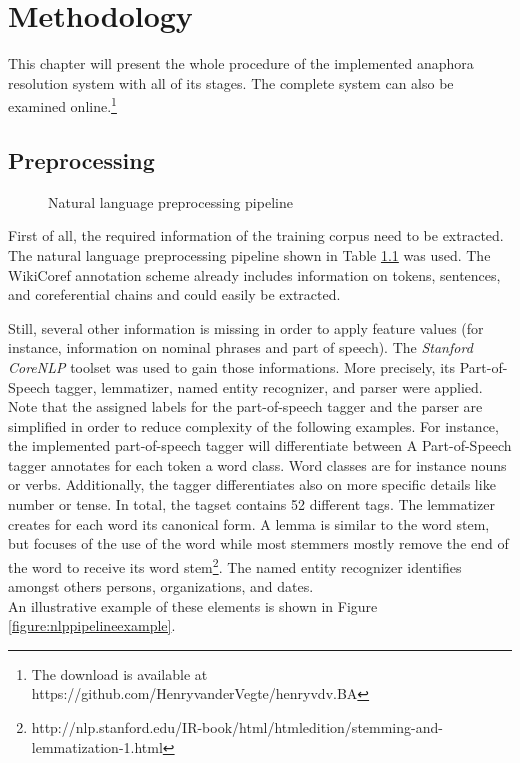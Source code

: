 \chapter{Methodology}
\label{sec:Methodology}

This chapter will present the whole procedure of the implemented anaphora resolution system with all of its stages. The complete system can also be examined online.\footnote{The download is available at https://github.com/HenryvanderVegte/henryvdv.BA}


\section{Preprocessing}
\begin{figure}[h]
	\centering

	\caption{Natural language preprocessing pipeline}
	\label{figure:nlppipeline}
\end{figure}

First of all, the required information of the training corpus need to be extracted. The natural language preprocessing pipeline shown in Table \ref{figure:nlppipeline} was used.  The WikiCoref annotation scheme already includes information on tokens, sentences, and coreferential chains and could easily be extracted.

Still, several other information is missing in order to apply feature values (for instance, information on nominal phrases and part of speech). The \textit{Stanford CoreNLP} toolset \citep{manning-EtAl:2014:P14-5} was used to gain those informations. More precisely, its Part-of-Speech tagger, lemmatizer, named entity recognizer, and parser were applied. 
Note that the assigned labels for the part-of-speech tagger and the parser are simplified in order to reduce complexity of the following examples. For instance, the implemented part-of-speech tagger will differentiate between 
A Part-of-Speech tagger annotates for each token a word class. Word classes are for instance nouns or verbs. Additionally, the tagger differentiates also on more specific details like number or tense. In total, the tagset contains 52 different tags.
The lemmatizer creates for each word its canonical form. A lemma is similar to the word stem, but focuses of the use of the word while most stemmers mostly remove the end of the word to receive its word stem\footnote{http://nlp.stanford.edu/IR-book/html/htmledition/stemming-and-lemmatization-1.html}.
The named entity recognizer identifies amongst others persons, organizations, and dates. \\
An illustrative example of these elements is shown in Figure \ref{figure:nlppipelineexample}. 

